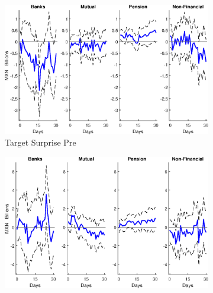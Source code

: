 \documentclass[a4paper, 12pt]{article}
\begin{document}
\begin{appendices}
\begin{landscape}
\begin{figure}[tbph]
\begin{center}
\begin{minipage}{\linewidth}
				\end{minipage} 
			\end{center}
		\end{figure}
	\end{landscape}
	
	\begin{landscape}
		\begin{figure}[tbph]
			\caption{Bonos Flow Response to Target and Path Surprises by Type of Domestic Investor} \label{fig:LPBonosVACateg2sb}
			\begin{center}
				\begin{minipage}{\linewidth}
					\begin{center}
						\begin{subfigure}[b]{0.475\textwidth}
							\centering
							\includegraphics[height=0.35\textheight,width=\textwidth]{../Figures/Target11BonosVACateg2pre.eps}
							\caption[]{{\small Target Surprise Pre}} \label{subfig:Target11BonosVACateg2pre}
						\end{subfigure}
						\hfill
						\begin{subfigure}[b]{0.475\textwidth}  
							\centering 
							\includegraphics[height=0.35\textheight,width=\textwidth]{../Figures/Path11BonosVACateg2pre.eps}

\end{subfigure}
\end{center}
\end{minipage}
\end{center}
\end{figure}
\end{landscape}
\end{appendices}
\end{document}

